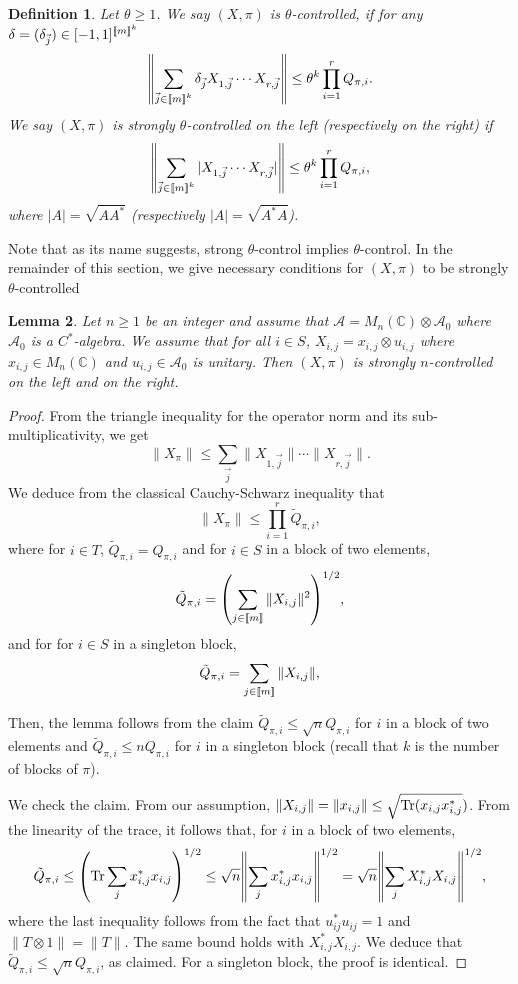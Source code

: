 \documentclass[11pt]{article}
\newtheorem{lemma}{Lemma}[section]
\newtheorem{definition}[lemma]{Definition}
\newcommand{\cA}{\mathcal{A}}
\newcommand{\Tr}{{\rm Tr}}
\newcommand{\dC}{\mathbb {C}}
\newcommand{\NRM}[1]{{{\left\| #1\right\|}}} %
\newcommand{\PAR}[1]{{{\left(#1\right)}}} %
\newcommand{\1}{1\!\!{\sf I}}
\newcommand{\INT}[1]{{{\left[\hspace{-1.4pt}\left[#1\right]\hspace{-1.4pt}\right]}}}
\begin{document}
\begin{definition}\label{def:Deltacontrol}
Let $\theta \geq 1$. 
We say $(X,\pi)$ is $\theta$-controlled, if for any $\delta = (\delta_{\vec j}) \in [-1,1]^{\INT{m}^k}$
$$
\NRM{\sum_{\vec j  \in \INT{m}^k} \delta_{\vec j} X_{1,\vec j}\cdots X_{r,\vec j}}\leq \theta^k\prod_{i=1}^r Q_{\pi,i}.
$$
We say $(X,\pi)$ is strongly $\theta$-controlled on the left (respectively on the right) if 
$$
\NRM{ \sum_{\vec j  \in \INT{m}^k} |X_{1,\vec j}\cdots X_{r,\vec j}| } \leq \theta^k \prod_{i=1}^r Q_{\pi,i},
$$
where $|  A |  = \sqrt{A A^*}$ (respectively $|  A |  = \sqrt{A^* A}$).
\end{definition} 
Note that as its name suggests, strong $\theta$-control implies $\theta$-control. In the remainder of this section, we give necessary conditions for $(X,\pi)$ to be strongly $\theta$-controlled

\begin{lemma}\label{le:NCCSuni}
Let $n \geq 1$ be an integer and assume that $\cA = M_n(\dC) \otimes \cA_0$ where $\cA_0$ is a $C^*$-algebra. We assume that for all $i \in S$, $X_{i,j} = x_{i,j} \otimes u_{i,j}$ where $x_{i,j} \in M_n(\dC)$ and $u_{i,j} \in \cA_0$ is unitary. Then $(X,\pi)$ is strongly $n$-controlled on the left and on the right.
\end{lemma}

\begin{proof}
From the triangle inequality for the operator norm and its sub-multiplicativity, we get 
$$
\| X_{\pi} \| \leq \sum_{\vec j} \|X_{1,\vec j}\| \cdots \| X_{r,\vec j} \|.
$$
We deduce from the classical Cauchy-Schwarz inequality that 
$$
\| X_{\pi} \| \leq \prod_{i=1}^r \tilde Q_{\pi,i},
$$
where for $i\in T$, $\tilde Q_{\pi,i} =  Q_{\pi,i}$ and for $i \in S$ in a block of two elements,
$$
\tilde Q_{\pi,i} =  \PAR{ \sum_{j\in \INT{m}} \| X_{i,j} \|^2 }^{1/2},
$$ 
and for for $i \in S$ in a singleton block,
$$
\tilde Q_{\pi,i} =  \sum_{j\in \INT{m}} \| X_{i,j} \| ,
$$

Then, the lemma follows from the claim $\tilde Q_{\pi,i} \leq \sqrt n  Q_{\pi,i} $  for $i$ in a block of two elements and $\tilde Q_{\pi,i} \leq n  Q_{\pi,i} $ for $i$ in a singleton block (recall that $k$ is the number of blocks of $\pi$). 

We check the claim. From our assumption, $\|X_{i,j}\| =\|x_{i,j}\| \leq \sqrt{\Tr (x_{i, j} x_{i,j}^* })$. From the linearity of the trace, it follows that, for $i$ in a block of two elements, 
$$
\tilde Q_{\pi,i}  \leq \PAR{\Tr   \sum_j x_{i,j}^* x_{i,j} }^{1/2}  \leq \sqrt n \NRM{  \sum_j x_{i,j}^* x_{i,j} }^{1/2} = \sqrt n \NRM{  \sum_j X_{i,j}^* X_{i,j} }^{1/2},
$$
where the last inequality follows from the fact that $u^*_{ij} u_{ij} = 1$ and $\| T \otimes 1 \| = \| T \|$. The same bound holds with $X_{i,j}^*X_{i,j}$. We deduce that $\tilde Q_{\pi,i} \leq \sqrt n Q_{\pi,i}$, as claimed. For a singleton block, the proof is identical.
\end{proof}
\end{document}
